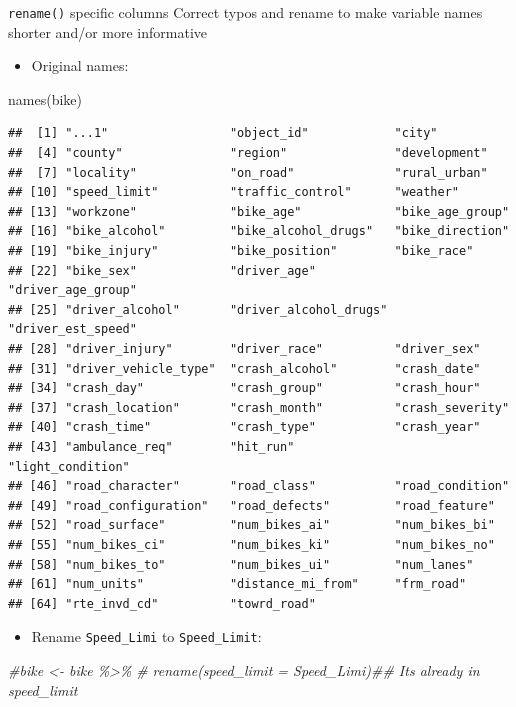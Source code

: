 \documentclass[
  ignorenonframetext,
]{beamer}
\newenvironment{Shaded}{\begin{snugshade}}{\end{snugshade}}
\newcommand{\CommentTok}[1]{\textcolor[rgb]{0.56,0.35,0.01}{\textit{#1}}}
\newcommand{\FunctionTok}[1]{\textcolor[rgb]{0.00,0.00,0.00}{#1}}
\newcommand{\NormalTok}[1]{#1}
\providecommand{\tightlist}{%
  \setlength{\itemsep}{0pt}\setlength{\parskip}{0pt}}
\begin{document}
\begin{frame}[fragile]{\texttt{rename()} specific columns}
\protect\hypertarget{rename-specific-columns}{}
Correct typos and rename to make variable names shorter and/or more
informative

\begin{itemize}
\tightlist
\item
  Original names:
\end{itemize}

\begin{Shaded}
\begin{Highlighting}[]
\FunctionTok{names}\NormalTok{(bike)}
\end{Highlighting}
\end{Shaded}

\begin{verbatim}
##  [1] "...1"                 "object_id"            "city"                
##  [4] "county"               "region"               "development"         
##  [7] "locality"             "on_road"              "rural_urban"         
## [10] "speed_limit"          "traffic_control"      "weather"             
## [13] "workzone"             "bike_age"             "bike_age_group"      
## [16] "bike_alcohol"         "bike_alcohol_drugs"   "bike_direction"      
## [19] "bike_injury"          "bike_position"        "bike_race"           
## [22] "bike_sex"             "driver_age"           "driver_age_group"    
## [25] "driver_alcohol"       "driver_alcohol_drugs" "driver_est_speed"    
## [28] "driver_injury"        "driver_race"          "driver_sex"          
## [31] "driver_vehicle_type"  "crash_alcohol"        "crash_date"          
## [34] "crash_day"            "crash_group"          "crash_hour"          
## [37] "crash_location"       "crash_month"          "crash_severity"      
## [40] "crash_time"           "crash_type"           "crash_year"          
## [43] "ambulance_req"        "hit_run"              "light_condition"     
## [46] "road_character"       "road_class"           "road_condition"      
## [49] "road_configuration"   "road_defects"         "road_feature"        
## [52] "road_surface"         "num_bikes_ai"         "num_bikes_bi"        
## [55] "num_bikes_ci"         "num_bikes_ki"         "num_bikes_no"        
## [58] "num_bikes_to"         "num_bikes_ui"         "num_lanes"           
## [61] "num_units"            "distance_mi_from"     "frm_road"            
## [64] "rte_invd_cd"          "towrd_road"
\end{verbatim}

\begin{itemize}
\tightlist
\item
  Rename \texttt{Speed\_Limi} to \texttt{Speed\_Limit}:
\end{itemize}

\begin{Shaded}
\begin{Highlighting}[]
\CommentTok{\#bike \textless{}{-} bike \%\textgreater{}\%}
\CommentTok{\#  rename(speed\_limit = Speed\_Limi)\#\# Its already in speed\_limit}
\end{Highlighting}
\end{Shaded}
\end{frame}
\end{document}
